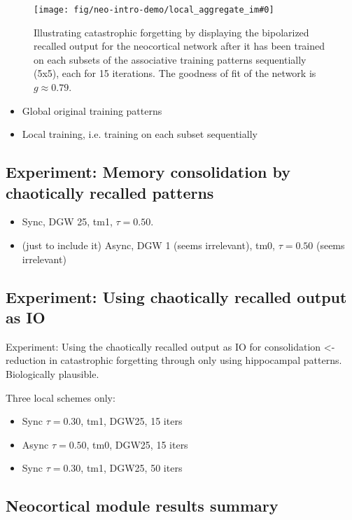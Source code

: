 \begin{figure}
    \centering
    \texttt{[image: fig/neo-intro-demo/local\_aggregate\_im\#0]}
    \caption{Illustrating catastrophic forgetting by displaying the bipolarized recalled output for the neocortical network after it has been trained on each subsets of the associative training patterns sequentially (5x5), each for 15 iterations. The goodness of fit of the network is $g\approx0.79$.}
    \label{fig:local_aggregate_im}
\end{figure}

\begin{itemize}
    \item Global original training patterns
    \item Local training, i.e. training on each subset sequentially
\end{itemize}

\subsection{Experiment: Memory consolidation by chaotically recalled patterns}

\begin{itemize}
    \item Sync, DGW 25, tm1, $\tau=0.50$.
    \item (just to include it) Async, DGW 1 (seems irrelevant), tm0, $\tau=0.50$ (seems irrelevant)
\end{itemize}

\subsection{Experiment: Using chaotically recalled output as IO}

Experiment: Using the chaotically recalled output as IO for consolidation <- reduction in catastrophic forgetting through only using hippocampal patterns. Biologically plausible.

Three local schemes only:
\begin{itemize}
    \item Sync $\tau=0.30$, tm1, DGW25, 15 iters
    \item Async $\tau=0.50$, tm0, DGW25, 15 iters
    \item Sync $\tau=0.30$, tm1, DGW25, 50 iters
\end{itemize}

\subsection{Neocortical module results summary}

